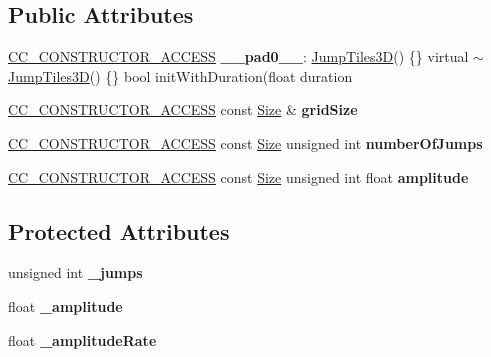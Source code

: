 \subsection*{Public Attributes}
\begin{DoxyCompactItemize}
\item 
\mbox{\label{classJumpTiles3D_a63d96d5cd4029be468bda27287f1a690}} 
\hyperlink{_2cocos2d_2cocos_2base_2ccConfig_8h_a25ef1314f97c35a2ed3d029b0ead6da0}{C\+C\+\_\+\+C\+O\+N\+S\+T\+R\+U\+C\+T\+O\+R\+\_\+\+A\+C\+C\+E\+SS} {\bfseries \+\_\+\+\_\+pad0\+\_\+\+\_\+}\+: \hyperlink{classJumpTiles3D}{Jump\+Tiles3D}() \{\} virtual $\sim$\hyperlink{classJumpTiles3D}{Jump\+Tiles3D}() \{\} bool init\+With\+Duration(float duration
\item 
\mbox{\label{classJumpTiles3D_abe528b5c86d489862537a618068349de}} 
\hyperlink{_2cocos2d_2cocos_2base_2ccConfig_8h_a25ef1314f97c35a2ed3d029b0ead6da0}{C\+C\+\_\+\+C\+O\+N\+S\+T\+R\+U\+C\+T\+O\+R\+\_\+\+A\+C\+C\+E\+SS} const \hyperlink{classSize}{Size} \& {\bfseries grid\+Size}
\item 
\mbox{\label{classJumpTiles3D_a6bc48ed64ba0ca4cc3e2c0426b3ed186}} 
\hyperlink{_2cocos2d_2cocos_2base_2ccConfig_8h_a25ef1314f97c35a2ed3d029b0ead6da0}{C\+C\+\_\+\+C\+O\+N\+S\+T\+R\+U\+C\+T\+O\+R\+\_\+\+A\+C\+C\+E\+SS} const \hyperlink{classSize}{Size} unsigned int {\bfseries number\+Of\+Jumps}
\item 
\mbox{\label{classJumpTiles3D_a71d5d577614ab176397321b3569e10ab}} 
\hyperlink{_2cocos2d_2cocos_2base_2ccConfig_8h_a25ef1314f97c35a2ed3d029b0ead6da0}{C\+C\+\_\+\+C\+O\+N\+S\+T\+R\+U\+C\+T\+O\+R\+\_\+\+A\+C\+C\+E\+SS} const \hyperlink{classSize}{Size} unsigned int float {\bfseries amplitude}
\end{DoxyCompactItemize}
\subsection*{Protected Attributes}
\begin{DoxyCompactItemize}
\item 
\mbox{\label{classJumpTiles3D_abef76bdc36c56606ffc31b916524969c}} 
unsigned int {\bfseries \+\_\+jumps}
\item 
\mbox{\label{classJumpTiles3D_a0728c58d921cbb849bc1df03c9e3e3d3}} 
float {\bfseries \+\_\+amplitude}
\item 
\mbox{\label{classJumpTiles3D_a4d427e97ed851cc6dc08142f990875f1}} 
float {\bfseries \+\_\+amplitude\+Rate}
\end{DoxyCompactItemize}
